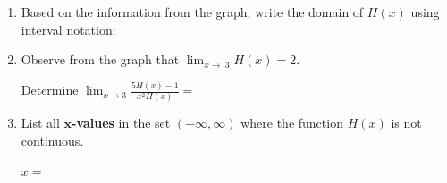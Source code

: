 \documentclass[12pt]{article}
\renewcommand{\emph}[1]{\textsf{\textbf{#1}}}
\newcommand{\blank}[1]{\rule{#1}{0.5pt}}
\newcommand{\mblank}[1]{\underline{\hspace{#1}}}
\renewcommand{\d}{\displaystyle}
\newcommand{\ds}{\displaystyle}
\begin{document}
\begin{enumerate}
\begin{center}
\begin{tikzpicture}[scale = .8]
\end{tikzpicture}
\end{center}

\begin{enumerate}
\item Based on the information from the graph, write the domain of $H(x)$ using interval notation:

 \hrulefill
\vspace{0.1in}
\item  Observe from the graph that $\d{\lim_{x \to\; 3}H(x)} = 2$. 

Determine $\ds{ \lim_{x \to 3 }\frac{5H(x) -1}{x^{2} H(x)} = }$ \vfill
\vspace{0.1in}
\item List all \emph{$\mathbf{x}$-values} in the set $(-\infty, \infty)$ where the function $H(x)$ is not continuous.%

$x = $ \ \hrulefill

\end{enumerate}


\end{enumerate}
\end{document}
